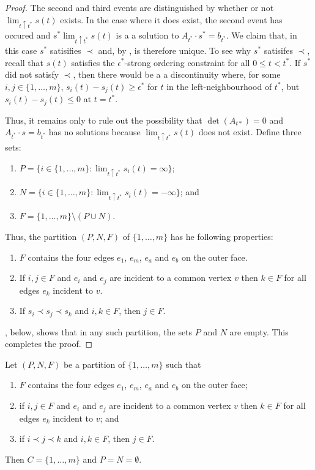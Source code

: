 \documentclass{patmorin}
\begin{document}
\begin{proof}
   The second and third events are distinguished by whether or not
   $\lim_{t\uparrow t^*} s(t)$ exists.  In the case where it does
   exist, the second event has occured and $s^*\lim_{t\uparrow t^*}
   s(t)$ is a a solution to $A_{t^*}\cdot s^*=b_{t^*}$.  We claim that,
   in this case $s^*$ satisifies $\prec$ and, by ,
   is therefore unique.  To see why $s^*$ satisifes $\prec$, recall
   that $s(t)$ satisfies the $\epsilon^*$-strong ordering constraint
   for all $0\le t<t^*$.  If $s^*$ did not satisfy $\prec$, then there
   would be a a discontinuity where, for some $i,j\in\{1,\ldots,m\}$,
   $s_i(t)-s_j(t)\ge \epsilon^*$ for $t$ in the left-neighbourhood of
   $t^*$, but $s_i(t)-s_j(t) \le 0$ at $t=t^*$.

   Thus, it remains only to rule out the possibility that $\det(A_{t*})=0$
   and $A_{t^*}\cdot s=b_{t^*}$ has no solutions because $\lim_{t\uparrow
   t^*} s(t)$ does not exist.  Define three sets:
   \begin{enumerate}
     \item $P=\{i\in \{1,\ldots,m\}:\lim_{t\uparrow t^*} s_i(t)=\infty\}$;
     \item $N=\{i\in \{1,\ldots,m\}:\lim_{t\uparrow t^*} s_i(t)=-\infty\}$; and
     \item $F=\{1,\ldots,m\}\setminus (P\cup N)$.
   \end{enumerate}

   Thus, the partition $(P,N,F)$ of $\{1,\ldots,m\}$ has he following
   properties:
   \begin{enumerate}
    \item $F$ contains the four edges $e_1$, $e_m$, $e_a$ and $e_b$
      on the outer face.
    \item If $i,j\in F$ and $e_i$ and $e_j$ are incident to a common
      vertex $v$ then $k\in F$ for all edges $e_k$ incident to $v$.
    \item If $s_i \prec s_j \prec s_k$ and $i,k\in F$, 
      then $j\in F$.
   \end{enumerate}
   , below, shows that in any such partition, the sets
   $P$ and $N$ are empty.  This completes the proof.
\end{proof}

\begin{lem}
   Let $(P,N,F)$ be a partition of $\{1,\ldots,m\}$ such that 
   \begin{enumerate}
    \item $F$ contains the four edges $e_1$, $e_m$, $e_a$ and $e_b$
      on the outer face;
    \item if $i,j\in F$ and $e_i$ and $e_j$ are incident to a common
      vertex $v$ then $k\in F$ for all edges $e_k$ incident to $v$; and
    \item if $i \prec j \prec k$ and $i,k\in F$, 
      then $j\in F$.
   \end{enumerate}
   Then $C=\{1,\ldots,m\}$ and $P=N=\emptyset$.
\end{lem}
\end{document}
